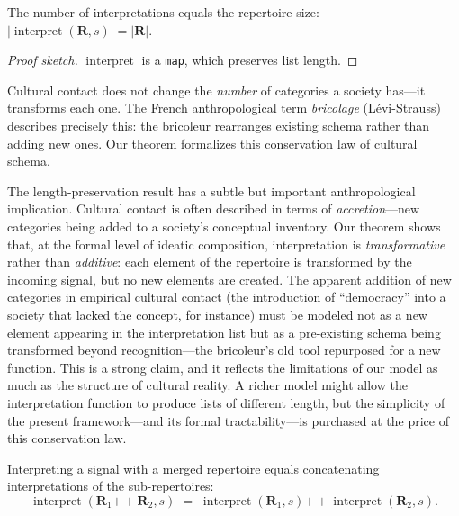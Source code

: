 \begin{theorem}
\label{thm:interp-length}
The number of interpretations equals the repertoire size:
$|\operatorname{interpret}(\mathbf{R}, s)| = |\mathbf{R}|$.
\end{theorem}

\begin{proof}[Proof sketch]
$\operatorname{interpret}$ is a \texttt{map}, which preserves list length.
\end{proof}

Cultural contact does not change the \emph{number} of categories a society
has---it transforms each one.  The French anthropological term
\emph{bricolage} (Lévi-Strauss) describes precisely this: the bricoleur
rearranges existing schema rather than adding new ones.  Our theorem
formalizes this conservation law of cultural schema.

The length-preservation result has a subtle but important anthropological
implication.  Cultural contact is often described in terms of
\emph{accretion}---new categories being added to a society's conceptual
inventory.  Our theorem shows that, at the formal level of ideatic
composition, interpretation is \emph{transformative} rather than
\emph{additive}: each element of the repertoire is transformed by the
incoming signal, but no new elements are created.  The apparent addition
of new categories in empirical cultural contact (the introduction of
``democracy'' into a society that lacked the concept, for instance)
must be modeled not as a new element appearing in the interpretation list
but as a pre-existing schema being transformed beyond recognition---the
bricoleur's old tool repurposed for a new function.  This is a strong
claim, and it reflects the limitations of our model as much as the
structure of cultural reality.  A richer model might allow the
interpretation function to produce lists of different length, but the
simplicity of the present framework---and its formal tractability---is
purchased at the price of this conservation law.

\begin{theorem}
\label{thm:rep-additivity}
Interpreting a signal with a merged repertoire equals concatenating
interpretations of the sub-repertoires:
\[
  \operatorname{interpret}(\mathbf{R}_1 \mathbin{+\!\!\!+} \mathbf{R}_2, s)
  \;=\;
  \operatorname{interpret}(\mathbf{R}_1, s)
  \mathbin{+\!\!\!+}
  \operatorname{interpret}(\mathbf{R}_2, s).
\]
\end{theorem}

